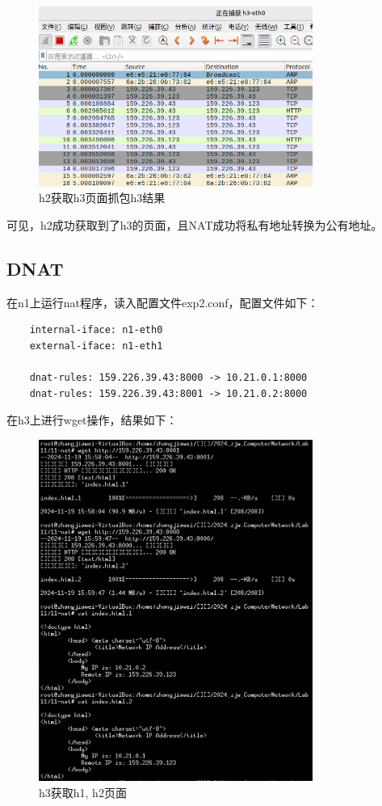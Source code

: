 \documentclass[UTF8]{report}
\begin{document}
\begin{figure}[H]
    \centering
    \includegraphics[width=0.8\textwidth]{snat_ws_h3.png}
    \caption{h2获取h3页面抓包h3结果}
\end{figure}

可见，h2成功获取到了h3的页面，且NAT成功将私有地址转换为公有地址。

\subsection{DNAT}

在n1上运行nat程序，读入配置文件exp2.conf，配置文件如下：

\begin{lstlisting}
    internal-iface: n1-eth0
    external-iface: n1-eth1
    
    dnat-rules: 159.226.39.43:8000 -> 10.21.0.1:8000
    dnat-rules: 159.226.39.43:8001 -> 10.21.0.2:8000
\end{lstlisting}

在h3上进行wget操作，结果如下：

\begin{figure}[H]
    \centering
    \includegraphics[width=0.8\textwidth]{dnat_html_h3.png}
    \caption{h3获取h1, h2页面}
\end{figure}
\end{document}
